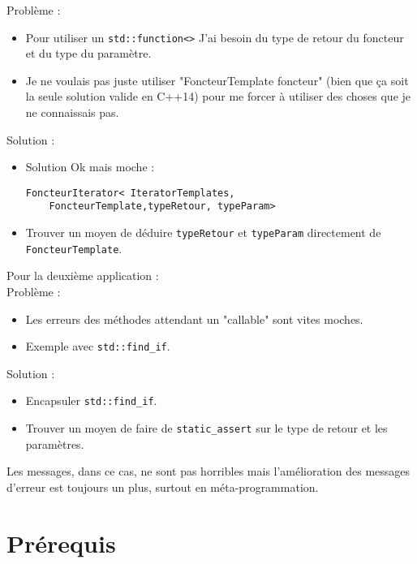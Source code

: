 \documentclass{beamer}
\begin{document}
\begin{frame}[containsverbatim]
	Problème : 
	\begin{itemize}
		\item Pour utiliser un \lstinline{std::function<>} J'ai besoin du type de retour du foncteur et du type du paramètre. 
		\item Je ne voulais pas juste utiliser "FoncteurTemplate foncteur" (bien que ça soit la seule solution valide en C++14) pour me forcer à utiliser des choses que je ne connaissais pas.
	\end{itemize}
	Solution :
	\begin{itemize}
		\item Solution Ok mais moche : 
	\begin{lstlisting}
FoncteurIterator< IteratorTemplates,
    FoncteurTemplate,typeRetour, typeParam>
	\end{lstlisting}		
		\item Trouver un moyen de déduire \lstinline{typeRetour} et \lstinline{typeParam} directement de \lstinline{FoncteurTemplate}. 
	\end{itemize}
\end{frame}

\begin{frame}
	Pour la deuxième application :  
\\
		Problème : 
	\begin{itemize}
		\item Les erreurs des méthodes attendant un "callable" sont vites moches.
		\item Exemple avec \lstinline{std::find_if}.
	\end{itemize}
	Solution :
	\begin{itemize}
		\item Encapsuler \lstinline{std::find_if}.
		\item Trouver un moyen de faire de \lstinline{static_assert} sur le type de retour et les paramètres. 
	\end{itemize}
	
	Les messages, dans ce cas, ne sont pas horribles mais l’amélioration des messages d'erreur est toujours un plus, surtout en méta-programmation.
\end{frame}

\section{Prérequis}
\end{document}
